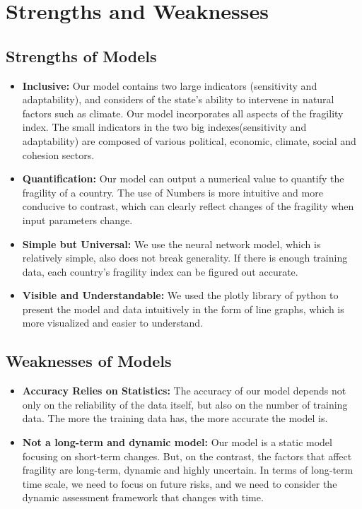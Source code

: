 \documentclass{mcmthesis}
\begin{document}
\section{Strengths and Weaknesses}
\subsection{Strengths of Models}
\begin{itemize}
  \item \textbf{Inclusive:} Our model contains two large indicators (sensitivity and adaptability), and 
  considers of the state's ability to intervene in natural factors such as climate. 
  Our model incorporates all aspects of the fragility index. The small indicators 
  in the two big indexes(sensitivity and adaptability) are composed of various political, 
  economic, climate, social and cohesion sectors.
  \item \textbf{Quantification:} Our model can output a numerical value to quantify the fragility of a country. 
  The use of Numbers is more intuitive and more conducive to contrast, which can clearly 
  reflect changes of the fragility when input parameters change.
  \item \textbf{Simple but Universal:} We use the neural network model, which is relatively simple, also does not break 
  generality. If there is enough training data, each country's fragility index 
  can be figured out  accurate.
  \item \textbf{Visible and Understandable:} We used the plotly library of python to present the model and data 
  intuitively in the form of line graphs, which is more visualized and 
  easier to understand.
\end{itemize}


\subsection{Weaknesses of Models}
\begin{itemize}
  \item \textbf{Accuracy Relies on Statistics:} The accuracy of our model 
  depends not only on the reliability of the data itself, but also on the 
  number of training data. The more the training data has, 
  the more accurate the model is.
  \item \textbf{Not a long-term and dynamic model:} Our model is a static 
  model focusing on short-term changes. But, on the contrast, the factors 
  that affect fragility are long-term, dynamic and highly uncertain. 
  In terms of long-term time scale, we need to focus on future risks, and 
  we need to consider the dynamic assessment framework that changes with time. 
\end{itemize}
\restoregeometry
\end{document}
